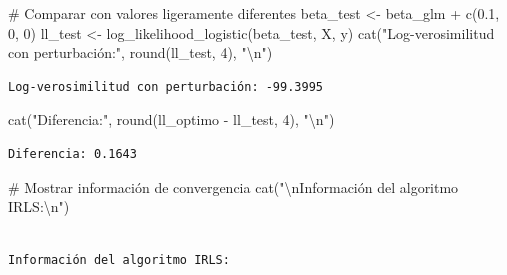 \documentclass[
  letterpaper,
  DIV=11,
  numbers=noendperiod]{scrreprt}
\newenvironment{Shaded}{\begin{snugshade}}{\end{snugshade}}
\newcommand{\CommentTok}[1]{\textcolor[rgb]{0.37,0.37,0.37}{#1}}
\newcommand{\DecValTok}[1]{\textcolor[rgb]{0.68,0.00,0.00}{#1}}
\newcommand{\FloatTok}[1]{\textcolor[rgb]{0.68,0.00,0.00}{#1}}
\newcommand{\FunctionTok}[1]{\textcolor[rgb]{0.28,0.35,0.67}{#1}}
\newcommand{\NormalTok}[1]{\textcolor[rgb]{0.00,0.23,0.31}{#1}}
\newcommand{\OtherTok}[1]{\textcolor[rgb]{0.00,0.23,0.31}{#1}}
\newcommand{\SpecialCharTok}[1]{\textcolor[rgb]{0.37,0.37,0.37}{#1}}
\newcommand{\StringTok}[1]{\textcolor[rgb]{0.13,0.47,0.30}{#1}}
\begin{document}
\begin{tcolorbox}
\begin{Shaded}
\begin{Highlighting}[]
\CommentTok{\# Comparar con valores ligeramente diferentes}
\NormalTok{beta\_test }\OtherTok{\textless{}{-}}\NormalTok{ beta\_glm }\SpecialCharTok{+} \FunctionTok{c}\NormalTok{(}\FloatTok{0.1}\NormalTok{, }\DecValTok{0}\NormalTok{, }\DecValTok{0}\NormalTok{)}
\NormalTok{ll\_test }\OtherTok{\textless{}{-}} \FunctionTok{log\_likelihood\_logistic}\NormalTok{(beta\_test, X, y)}
\FunctionTok{cat}\NormalTok{(}\StringTok{"Log{-}verosimilitud con perturbación:"}\NormalTok{, }\FunctionTok{round}\NormalTok{(ll\_test, }\DecValTok{4}\NormalTok{), }\StringTok{"}\SpecialCharTok{\textbackslash{}n}\StringTok{"}\NormalTok{)}
\end{Highlighting}
\end{Shaded}

\begin{verbatim}
Log-verosimilitud con perturbación: -99.3995 
\end{verbatim}

\begin{Shaded}
\begin{Highlighting}[]
\FunctionTok{cat}\NormalTok{(}\StringTok{"Diferencia:"}\NormalTok{, }\FunctionTok{round}\NormalTok{(ll\_optimo }\SpecialCharTok{{-}}\NormalTok{ ll\_test, }\DecValTok{4}\NormalTok{), }\StringTok{"}\SpecialCharTok{\textbackslash{}n}\StringTok{"}\NormalTok{)}
\end{Highlighting}
\end{Shaded}

\begin{verbatim}
Diferencia: 0.1643 
\end{verbatim}

\begin{Shaded}
\begin{Highlighting}[]
\CommentTok{\# Mostrar información de convergencia}
\FunctionTok{cat}\NormalTok{(}\StringTok{"}\SpecialCharTok{\textbackslash{}n}\StringTok{Información del algoritmo IRLS:}\SpecialCharTok{\textbackslash{}n}\StringTok{"}\NormalTok{)}
\end{Highlighting}
\end{Shaded}

\begin{verbatim}

Información del algoritmo IRLS:
\end{verbatim}

\begin{Shaded}
\end{Shaded}


\end{tcolorbox}
\end{document}
